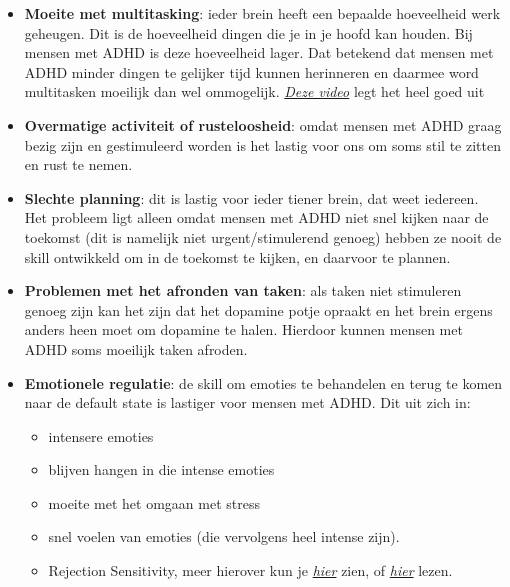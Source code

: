 \documentclass{article}
\begin{document}
\begin{itemize}
                        \item \textbf{Moeite met multitasking}: 
                            ieder brein heeft een bepaalde hoeveelheid werk geheugen. Dit is de hoeveelheid dingen die je in je hoofd kan houden. Bij mensen met ADHD is deze hoeveelheid lager. Dat betekend dat mensen met ADHD minder dingen te gelijker tijd kunnen herinneren en daarmee word multitasken moeilijk dan wel ommogelijk. \emph{\hyperlink{https://www.youtube.com/watch?v=HszXKZO_H18&ab_channel=HowtoADHD}{Deze video}}\cite{ADHD-video-working-memory} legt het heel goed uit
                        \item \textbf{Overmatige activiteit of rusteloosheid}: 
                            omdat mensen met ADHD graag bezig zijn en gestimuleerd worden is het lastig voor ons om soms stil te zitten en rust te nemen.
                        \item \textbf{Slechte planning}: 
                            dit is lastig voor ieder tiener brein, dat weet iedereen. Het probleem ligt alleen omdat mensen met ADHD niet snel kijken naar de toekomst (dit is namelijk niet urgent/stimulerend genoeg) hebben ze nooit de skill ontwikkeld om in de toekomst te kijken, en daarvoor te plannen. 
                        \item \textbf{Problemen met het afronden van taken}: 
                            als taken niet stimuleren genoeg zijn kan het zijn dat het dopamine potje opraakt en het brein ergens anders heen moet om dopamine te halen. Hierdoor kunnen mensen met ADHD soms moeilijk taken afroden.
                        \item \textbf{Emotionele regulatie}: 
                            de skill om emoties te behandelen en terug te komen naar de default state is lastiger voor mensen met ADHD. Dit uit zich in:
                            \begin{itemize}
                                \item intensere emoties
                                \item blijven hangen in die intense emoties
                                \item moeite met het omgaan met stress
                                \item snel voelen van emoties (die vervolgens heel intense zijn). 
                                \item Rejection Sensitivity, meer hierover kun je \hyperlink{https://www.youtube.com/watch?v=ZQ44ynEjsHQ&ab_channel=KatiMorton}{\emph{hier}}\cite{ADHD-video-rejection-sensitivity} zien, of \hyperlink{https://my.clevelandclinic.org/health/diseases/24099-rejection-sensitive-dysphoria-rsd}{\emph{hier}} lezen\cite{ADHD-rejection-sensitivity}.
                            \end{itemize}
                \end{itemize}
\end{document}
